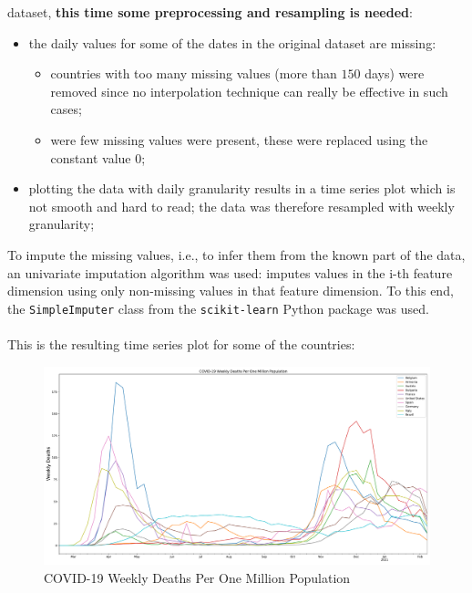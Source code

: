 \documentclass[11pt,a4paper]{article}
\begin{document}
dataset\cite{ourworldindata}, \textbf{this time some preprocessing and
resampling is needed}:
\begin{itemize}
    \item the daily values for some of the dates in the original dataset are missing:
    \begin{itemize}
        \item countries with too many missing values (more than $150$ days) were
        removed since no interpolation technique can really be effective in such
        cases;
        \item were few missing values were present, these were replaced using
        the constant value $0$;
    \end{itemize}
    \item plotting the data with daily granularity results in a time series plot
    which is not smooth and hard to read; the data was therefore resampled with
    weekly granularity;
\end{itemize}
To impute the missing values, i.e., to infer them from the known part of the
data, an univariate imputation algorithm was used: imputes values in the
i-th feature dimension using only non-missing values in that feature dimension.
To this end, the \texttt{SimpleImputer} class from the \texttt{scikit-learn}
Python package was used.\\
\\
This is the resulting time series plot for some of the countries:
\begin{figure}[H]
    \begin{center}
        \hspace*{-0.3cm}
        \includegraphics[scale=0.325]{img/weekly-deaths-per-million.pdf}
    \end{center}
    \caption{COVID-19 Weekly Deaths Per One Million Population}
\end{figure}
\end{document}
